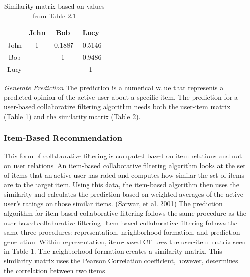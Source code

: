 \begin{table}[ht]
\caption{Similarity matrix based on values from Table 2.1} %
\centering  %
\begin{tabular}{c c c c} %
\hline\hline                        %
 & John & Bob& Lucy \\ [0.5ex] %
\hline                  %

John & 1 & -0.1887  & -0.5146 \\
Bob &  & 1 & -0.9486 \\
Lucy &  & & 1 \\[1ex]      %
\hline %
\end{tabular}
\label{table:3} %
\end{table}

\textit{Generate Prediction}
The prediction is a numerical value that represents a predicted opinion of the active user about a specific item. The prediction for a user-based collaborative filtering algorithm needs both the user-item matrix (Table 1) and the similarity matrix (Table 2).
\subsubsection{Item‐Based Recommendation}
This form of collaborative filtering is computed based on item relations and not on user relations. An item-based collaborative filtering algorithm looks at the set of items that an active user has rated and computes how similar the set of items are to the target item. Using this data, the item-based algorithm then uses the similarity and calculates the prediction based on weighted averages of the active user’s ratings on those similar items. (Sarwar, et al. 2001)
The prediction algorithm for item-based collaborative filtering follows the same procedure as the user-based collaborative filtering. Item-based collaborative filtering follows the same three procedures: representation, neighborhood formation, and prediction generation. Within representation, item-based CF uses the user-item matrix seen in Table 1. The neighborhood formation creates a similarity matrix. This  similarity matrix uses the Pearson Correlation coefficient, however, determines the correlation between two items
